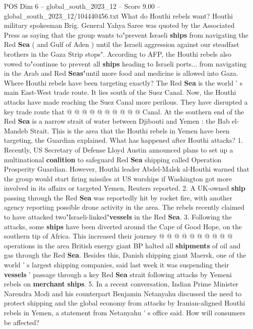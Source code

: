 \begin{textsample}{POS Dim 6 – global\_south\_2023\_12 – Score 9.00 – global\_south\_2023\_12/104440456.txt}
What do Houthi rebels want?
Houthi military spokesman Brig.
General Yahya Saree was quoted by the Associated Press as saying that the group wants to"prevent Israeli \textbf{ships} from navigating the Red \textbf{Sea} ( and Gulf of Aden ) until the Israeli aggression against our steadfast brothers in the Gaza Strip stops".
According to AFP, the Houthi rebels also vowed to"continue to prevent all \textbf{ships} heading to Israeli ports... from navigating in the Arab and Red \textbf{Seas}"until more food and medicine is allowed into Gaza.
Where Houthi rebels have been targeting exactly?
The Red \textbf{Sea} is the world ' s main East-West trade route.
It lies south of the Suez Canal.
Now, the Houthi attacks have made reaching the Suez Canal more perilous.
They have disrupted a key trade route that @ @ @ @ @ @ @ @ @ @ Canal.
At the southern end of the Red \textbf{Sea} is a narrow strait of water between Djibouti and Yemen : the Bab el-Mandeb Strait.
This is the area that the Houthi rebels in Yemen have been targeting, the Guardian explained.
What has happened after Houthi attacks? 1.
Recently, US Secretary of Defense Lloyd Austin announced plans to set up a multinational \textbf{coalition} to safeguard Red \textbf{Sea} shipping called Operation Prosperity Guardian.
However, Houthi leader Abdel-Malek al-Houthi warned that the group would start firing missiles at US warships if Washington got more involved in its affairs or targeted Yemen, Reuters reported. 2.
A UK-owned \textbf{ship} passing through the Red \textbf{Sea} was reportedly hit by rocket fire, with another agency reporting possible drone activity in the area.
The rebels recently claimed to have attacked two"Israeli-linked"\textbf{vessels} in the Red \textbf{Sea}. 3.
Following the attacks, some \textbf{ships} have been diverted around the Cape of Good Hope, on the southern tip of Africa.
This increased their journey @ @ @ @ @ @ @ @ @ @ operations in the area British energy giant BP halted all \textbf{shipments} of oil and gas through the Red \textbf{Sea}.
Besides this, Danish shipping giant Maersk, one of the world ' s largest shipping companies, said last week it was suspending their \textbf{vessels} ' passage through a key Red \textbf{Sea} strait following attacks by Yemeni rebels on \textbf{merchant} \textbf{ships}. 5.
In a recent conversation, Indian Prime Minister Narendra Modi and his counterpart Benjamin Netanyahu discussed the need to protect shipping and the global economy from attacks by Iranian-aligned Houthi rebels in Yemen, a statement from Netanyahu ' s office said.
How will consumers be affected?

\end{textsample}
